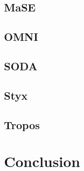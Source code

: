 \documentclass{article}
\begin{document}
\subsection{MaSE}
\subsection{OMNI}
\subsection{SODA}
\subsection{Styx}
\subsection{Tropos}
\section{Conclusion}



\end{document}
